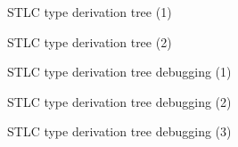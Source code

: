 \documentclass{beamer}
\begin{document}
\begin{frame}{STLC type derivation tree (1)}
\begin{center}

\end{center}
\end{frame}

\begin{frame}{STLC type derivation tree (2)}
\begin{center}
{\tiny

}
\end{center}
\end{frame}

\begin{frame}{STLC type derivation tree debugging (1)}
\begin{center}
{\tiny

}
\end{center}
\end{frame}

\begin{frame}{STLC type derivation tree debugging (2)}
\begin{center}
{\tiny

}
\end{center}
\end{frame}

\begin{frame}{STLC type derivation tree debugging (3)}
\begin{center}
{\tiny

}
\end{center}
\end{frame}
\end{document}
